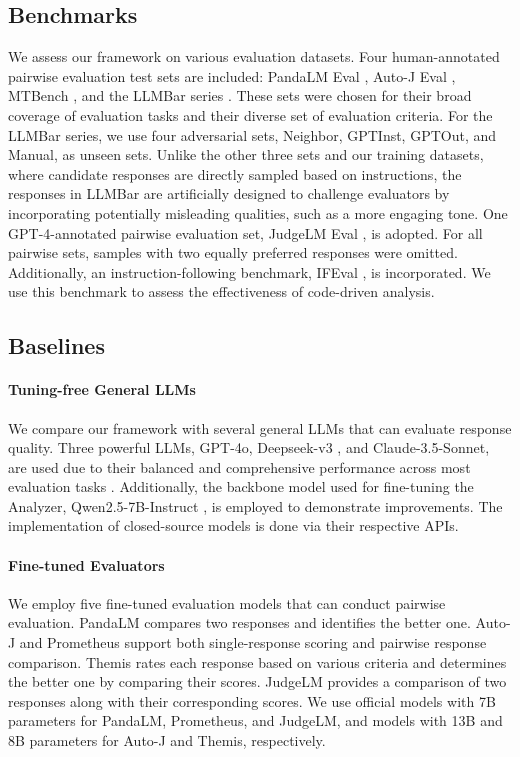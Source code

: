 \subsection{Benchmarks}

We assess our framework on various evaluation datasets. Four human-annotated pairwise evaluation test sets are included: PandaLM Eval \cite{pandalm}, Auto-J Eval \cite{auto-j}, MTBench \cite{mtbench}, and the LLMBar series \cite{llmbar}. These sets were chosen for their broad coverage of evaluation tasks and their diverse set of evaluation criteria. For the LLMBar series, we use four adversarial sets, Neighbor, GPTInst, GPTOut, and Manual, as unseen sets. Unlike the other three sets and our training datasets, where candidate responses are directly sampled based on instructions, the responses in LLMBar are artificially designed to challenge evaluators by incorporating potentially misleading qualities, such as a more engaging tone. One GPT-4-annotated pairwise evaluation set, JudgeLM Eval \cite{judgelm}, is adopted. For all pairwise sets, samples with two equally preferred responses were omitted. Additionally, an instruction-following benchmark, IFEval \cite{ifeval}, is incorporated. We use this benchmark to assess the effectiveness of code-driven analysis.

\subsection{Baselines}

\paragraph{Tuning-free General LLMs}
We compare our framework with several general LLMs that can evaluate response quality. Three powerful LLMs, GPT-4o, Deepseek-v3 \cite{deepseek-v3}, and Claude-3.5-Sonnet, are used due to their balanced and comprehensive performance across most evaluation tasks \cite{sft_eval_limit}. Additionally, the backbone model used for fine-tuning the Analyzer, Qwen2.5-7B-Instruct \cite{qwen25}, is employed to demonstrate improvements. The implementation of closed-source models is done via their respective APIs.

\paragraph{Fine-tuned Evaluators}
We employ five fine-tuned evaluation models that can conduct pairwise evaluation. PandaLM \cite{pandalm} compares two responses and identifies the better one. Auto-J \cite{auto-j} and Prometheus \cite{prometheus2} support both single-response scoring and pairwise response comparison. Themis \cite{themis} rates each response based on various criteria and determines the better one by comparing their scores. JudgeLM \cite{judgelm} provides a comparison of two responses along with their corresponding scores. We use official models with 7B parameters for PandaLM, Prometheus, and JudgeLM, and models with 13B and 8B parameters for Auto-J and Themis, respectively.

